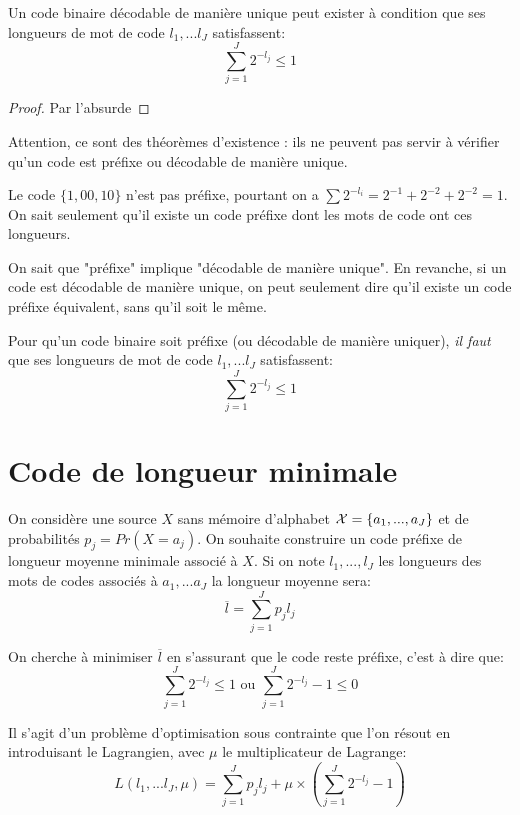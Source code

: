\documentclass[main.tex]{subfiles}
\begin{document}
\begin{prop}

Un code binaire décodable de manière unique peut exister à condition que ses longueurs de mot de code $l_1,...l_J$ satisfassent:
 \[\sum_{j=1}^J2^{-l_j} \leq 1 \]
\end{prop}
\begin{proof}
  Par l'absurde
\end{proof}
\begin{rem}
Attention, ce sont des théorèmes d'existence : ils ne peuvent pas servir à vérifier qu'un code est préfixe ou décodable de manière unique.

\begin{exemple}
Le code $\{1,00,10\}$ n'est pas préfixe, pourtant on a $\sum 2^{-l_i} = 2^{-1} + 2^{-2} + 2^{-2} = 1$. On sait seulement qu'il existe un code préfixe dont les mots de code ont ces longueurs.
\end{exemple}
\end{rem}

\begin{rem}
On sait que "préfixe" implique "décodable de manière unique". En revanche, si un code est décodable de manière unique, on peut seulement dire qu'il existe un code préfixe équivalent, sans qu'il soit le même.
\end{rem}

\begin{corol}
Pour qu'un code binaire soit préfixe (ou décodable de manière uniquer), \emph{il faut} que ses longueurs de mot de code $l_1,...l_J$ satisfassent:
\[\sum_{j=1}^J2^{-l_j} \leq 1 \]
\end{corol}

\section{Code de longueur minimale}
On considère une source $X$ sans mémoire d'alphabet $\mathcal{X} = \{a_1,...,a_J\}$ et de probabilités $p_j = Pr(X=a_j)$.
On souhaite construire un code préfixe de longueur moyenne minimale associé à $X$.
Si on note $l_1,...,l_J$ les longueurs des mots de codes associés à $a_1,...a_J$ la longueur moyenne sera:
\[\overline{l}=\sum_{j=1}^Jp_jl_j\]

On cherche à minimiser $\overline{l}$ en s'assurant que le code reste préfixe, c'est à dire que:
 \[\sum_{j=1}^J2^{-l_j} \leq 1 \text{ ou } \sum_{j=1}^J2^{-l_j} - 1 \leq 0\]

Il s'agit d'un problème d'optimisation sous contrainte que l'on résout en introduisant le Lagrangien, avec $\mu$ le multiplicateur de Lagrange:
 \[L(l_1,...l_J,\mu) = \sum_{j=1}^Jp_jl_j + \mu\times (\sum_{j=1}^J2^{-l_j} - 1) \]
\end{document}
